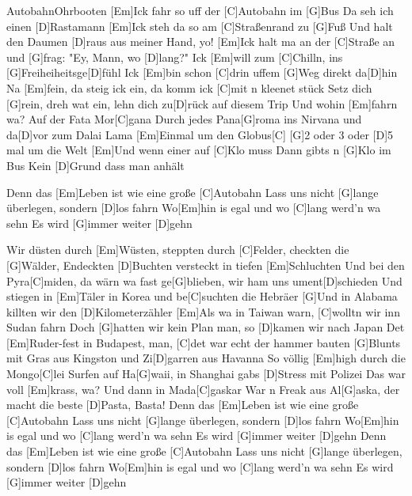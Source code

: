 \documentclass[../main.tex]{subfiles}
\begin{document}
\begin{song}{Autobahn}{Ohrbooten}{}
[Em]Ick fahr so uff der [C]Autobahn im [G]Bus
Da seh ich einen [D]Rastamann
[Em]Ick steh da so am [C]Straßenrand zu [G]Fuß
Und halt den Daumen [D]raus aus meiner Hand, yo!
[Em]Ick halt ma an der [C]Straße an und [G]frag: "Ey, Mann, wo [D]lang?"
Ick [Em]will \hh{}\hh zum [C]Chilln, \hh{}\hh ins [G]Freiheiheitsge[D]fühl
Ick [Em]bin \hh{}\hh schon [C]drin \hh{}\hh uffem [G]Weg direkt da[D]hin
Na [Em]fein, da steig ick ein, da komm ick [C]mit n kleenet stück
Setz dich [G]rein, dreh wat ein, lehn dich zu[D]rück auf diesem Trip
Und wohin [Em]fahrn wa? Auf der Fata Mor[C]gana
Durch jedes Pana[G]roma ins Nirvana und da[D]vor zum Dalai Lama
[Em]Einmal um den Globus[C]{\hh}
[G]2 oder 3 oder [D]5 mal um die Welt
[Em]Und wenn einer auf [C]Klo muss
Dann gibts n [G]Klo im Bus
Kein [D]Grund dass man anhält

Denn das [Em]Leben ist wie eine große [C]Autobahn
Lass uns nicht [G]lange überlegen, sondern [D]los fahrn
Wo[Em]hin is egal und wo [C]lang werd'n wa sehn
Es wird [G]immer weiter [D]gehn

Wir düsten durch [Em]Wüsten, steppten durch [C]Felder, checkten die [G]Wälder, 
Endeckten [D]Buchten versteckt in tiefen [Em]Schluchten
Und bei den Pyra[C]miden, da wärn wa fast ge[G]blieben, wir ham uns ument[D]schieden
Und stiegen in [Em]Täler in Korea und be[C]suchten die Hebräer
[G]Und in Alabama killten wir den [D]Kilometerzähler
[Em]Als wa in Taiwan warn, [C]wolltn wir inn Sudan fahrn
Doch [G]hatten wir kein Plan man, so [D]kamen wir nach Japan
Det [Em]Ruder-fest in Budapest, man, [C]det war echt der hammer
bauten [G]Blunts mit Gras aus Kingston und Zi[D]garren aus Havanna
So völlig [Em]high \hh{}\hh durch die Mongo[C]lei \hh{}
Surfen auf Ha[G]waii, in Shanghai gabs [D]Stress mit Polizei
Das war voll [Em]krass, wa? Und dann in Mada[C]gaskar
War n Freak aus Al[G]aska, der macht die beste [D]Pasta, Basta!
\pagebreak
{}
Denn das [Em]Leben ist wie eine große [C]Autobahn
Lass uns nicht [G]lange überlegen, sondern [D]los fahrn
Wo[Em]hin is egal und wo [C]lang werd'n wa sehn
Es wird [G]immer weiter [D]gehn
Denn das [Em]Leben ist wie eine große [C]Autobahn
Lass uns nicht [G]lange überlegen, sondern [D]los fahrn
Wo[Em]hin is egal und wo [C]lang werd'n wa sehn
Es wird [G]immer weiter [D]gehn


\end{song}
\end{document}
